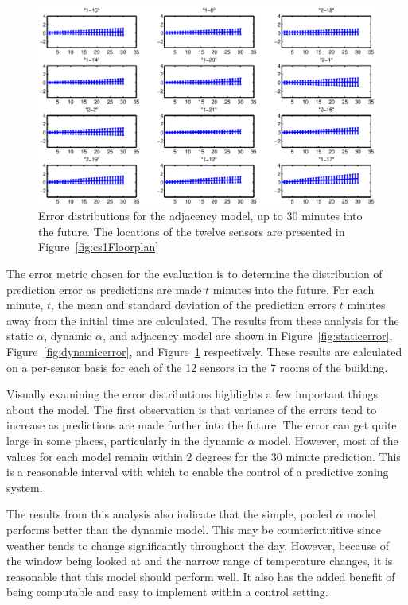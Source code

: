\begin{figure}[!htb]
\begin{center}
\includegraphics[width=0.8\columnwidth]{fig/PooledAdjError.eps}
\end{center}
\caption[Error distributions for the adjacency model]{Error distributions for
the adjacency model, up to 30 minutes into the future. The locations of the
twelve sensors are presented in Figure~\ref{fig:cs1Floorplan}}
\label{fig:adjerror}
\end{figure}

The error metric chosen for the evaluation is to determine the distribution of
prediction error as predictions are made $t$ minutes into the future. For each
minute, $t$, the mean and standard deviation of the prediction errors $t$
minutes away from the initial time are calculated. The results from these
analysis for the static $\alpha$, dynamic $\alpha$, and adjacency model are
shown in Figure~\ref{fig:staticerror}, Figure~\ref{fig:dynamicerror}, and
Figure~\ref{fig:adjerror} respectively. These results are calculated on a
per-sensor basis for each of the 12 sensors in the 7 rooms of the building.

Visually examining the error distributions highlights a few important things
about the model. The first observation is that variance of the errors tend to
increase as predictions are made further into the future. The error can get
quite large in some places, particularly in the dynamic $\alpha$ model. However,
most of the values for each model remain within 2 degrees for the 30 minute
prediction. This is a reasonable interval with which to enable the control of a
predictive zoning system.

The results from this analysis also indicate that the simple, pooled $\alpha$
model performs better than the dynamic model. This may be counterintuitive since
weather tends to change significantly throughout the day. However, because of
the window being looked at and the narrow range of temperature changes, it is
reasonable that this model should perform well. It also has the added benefit of
being computable and easy to implement within a control setting.

